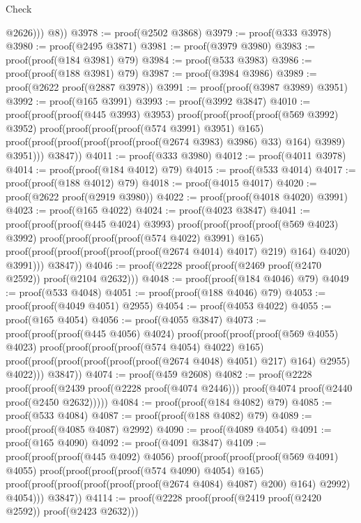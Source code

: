 \begin{lexlean}{Check}
\begin{coremodule}
                  @2626)))
          @8))
@3978 := proof(@2502 @3868)
@3979 := proof(@333 @3978)
@3980 := proof(@2495 @3871)
@3981 := proof(@3979 @3980)
@3983 := proof(proof(@184 @3981) @79)
@3984 := proof(@533 @3983)
@3986 := proof(proof(@188 @3981) @79)
@3987 := proof(@3984 @3986)
@3989 := proof(@2622 proof(@2887 @3978))
@3991 := proof(proof(@3987 @3989) @3951)
@3992 := proof(@165 @3991)
@3993 := proof(@3992 @3847)
@4010 := proof(proof(proof(@445 @3993) @3953)
      proof(proof(proof(proof(@569 @3992) @3952)
            proof(proof(proof(proof(@574 @3991) @3951) @165)
                proof(proof(proof(proof(proof(proof(@2674 @3983) @3986) @33) @164) @3989) @3951)))
          @3847))
@4011 := proof(@333 @3980)
@4012 := proof(@4011 @3978)
@4014 := proof(proof(@184 @4012) @79)
@4015 := proof(@533 @4014)
@4017 := proof(proof(@188 @4012) @79)
@4018 := proof(@4015 @4017)
@4020 := proof(@2622 proof(@2919 @3980))
@4022 := proof(proof(@4018 @4020) @3991)
@4023 := proof(@165 @4022)
@4024 := proof(@4023 @3847)
@4041 := proof(proof(proof(@445 @4024) @3993)
      proof(proof(proof(proof(@569 @4023) @3992)
            proof(proof(proof(proof(@574 @4022) @3991) @165)
                proof(proof(proof(proof(proof(proof(@2674 @4014) @4017) @219) @164) @4020) @3991)))
          @3847))
@4046 := proof(@2228 proof(proof(@2469 proof(@2470 @2592)) proof(@2104 @2632)))
@4048 := proof(proof(@184 @4046) @79)
@4049 := proof(@533 @4048)
@4051 := proof(proof(@188 @4046) @79)
@4053 := proof(proof(@4049 @4051) @2955)
@4054 := proof(@4053 @4022)
@4055 := proof(@165 @4054)
@4056 := proof(@4055 @3847)
@4073 := proof(proof(proof(@445 @4056) @4024)
      proof(proof(proof(proof(@569 @4055) @4023)
            proof(proof(proof(proof(@574 @4054) @4022) @165)
                proof(proof(proof(proof(proof(proof(@2674 @4048) @4051) @217) @164) @2955) @4022)))
          @3847))
@4074 := proof(@459 @2608)
@4082 := proof(@2228
      proof(proof(@2439 proof(@2228 proof(@4074 @2446)))
          proof(@4074 proof(@2440 proof(@2450 @2632)))))
@4084 := proof(proof(@184 @4082) @79)
@4085 := proof(@533 @4084)
@4087 := proof(proof(@188 @4082) @79)
@4089 := proof(proof(@4085 @4087) @2992)
@4090 := proof(@4089 @4054)
@4091 := proof(@165 @4090)
@4092 := proof(@4091 @3847)
@4109 := proof(proof(proof(@445 @4092) @4056)
      proof(proof(proof(proof(@569 @4091) @4055)
            proof(proof(proof(proof(@574 @4090) @4054) @165)
                proof(proof(proof(proof(proof(proof(@2674 @4084) @4087) @200) @164) @2992) @4054)))
          @3847))
@4114 := proof(@2228 proof(proof(@2419 proof(@2420 @2592)) proof(@2423 @2632)))

\end{coremodule}
\end{lexlean}
